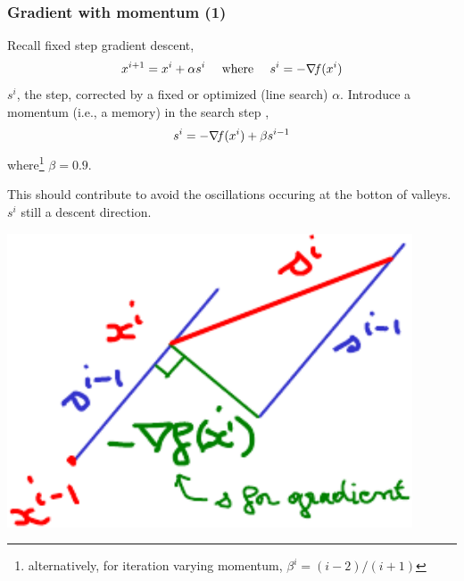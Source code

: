 \documentclass[12pt]{beamer}
\begin{document}
\begin{frame}
\frametitle{Gradient with momentum (1)} 
Recall fixed step gradient descent, 
\begin{equation*} 
x^{i+1} = x^i + \alpha s^i  \quad\text{ where }\quad s^i= -\nabla\!{f}(x^i) 
\end{equation*} 
$s^i$, the step, corrected by a fixed or optimized (line search) $\alpha$.
Introduce a momentum (i.e., a memory) in the search step \cite{polyak1964some},
\begin{equation*} 
s^i = -\nabla\!{f}(x^i) + \beta s^{i-1}
\end{equation*} 
where\footnote{alternatively, for iteration varying momentum, $\beta^i=(i-2)/(i+1)$} $\beta = 0.9$.\\
\vspace{-0.6cm}
\begin{minipage}[c]{0.5\textwidth}
This should contribute to avoid the oscillations occuring at the botton of valleys.\\
$s^i$ still a descent direction.
\end{minipage}
\begin{minipage}[c]{0.4\textwidth}
\begin{center}
\includegraphics[width=0.9\textwidth]{momentum-crop.pdf} 
\end{center}
\end{minipage}
\end{frame}
\end{document}
